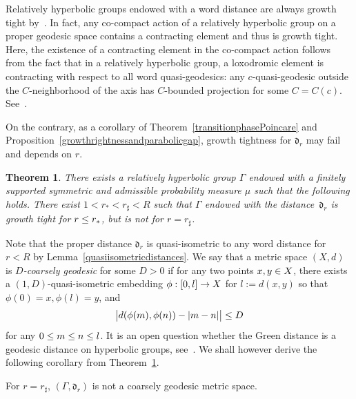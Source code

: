 \documentclass[10pt]{amsart}
\newtheorem{theo}{Theorem}[section]
\theoremstyle{definition}\newtheorem{defi}[theo]{Definition}\newtheorem{rema}[theo]{Remark}\newtheorem{exam}[theo]{Example}\newtheorem{exem}[theo]{Example}\newtheorem{nota}[theo]{Notation}
\newcommand{\fkd}{\mathfrak{d}}
\let\oldin\in
\renewcommand{\in}{\mathchoice{\oldin}{\oldin}{\,\oldin\,}{\,\oldin\,}}
\let\oldle\le
\renewcommand{\le}{\mathchoice{\oldle}{\oldle}{\,\oldle\,}{\,\oldle\,}}
\renewcommand*{\to}{\mathchoice{\longrightarrow}{\rightarrow}{\rightarrow}{\rightarrow}}
\begin{document}
Relatively hyperbolic groups endowed with a word distance are always growth tight by~\cite{ACT,YangTight}. In fact, any co-compact action of a relatively hyperbolic group on a proper geodesic space contains a contracting element and thus is growth tight. Here, the existence of a contracting element in the co-compact action follows from the fact that in a relatively hyperbolic group, a loxodromic element is contracting with respect to all word quasi-geodesics: any $c$-quasi-geodesic outside the $C$-neighborhood of the axis has $C$-bounded projection for some $C=C(c)$. See~\cite[Proposition~8.5]{GP16}.

On the contrary, as a corollary of Theorem~\ref{transitionphasePoincare} and Proposition~\ref{growthrightnessandparabolicgap}, growth tightness for $\fkd_r$ may fail and depends on $r$.

\begin{theo}\label{transitionphasegrowthtightness}
There exists a relatively hyperbolic group $\Gamma$ endowed with a finitely supported symmetric and admissible probability measure $\mu$ such that the following holds. There exist $1<r_*<r_\sharp<R$ such that $\Gamma$ endowed with the distance~$\fkd_r$ is growth tight for $r\le r_*$, but is not for $r=r_\sharp$.
\end{theo}



Note that the proper distance $\fkd_r$ is quasi-isometric to any word distance for $r<R$ by Lemma~\ref{quasiisometricdistances}. We say that a metric space $(X,d)$ is \emph{$D$-coarsely geodesic} for some\pagebreak{} $D>0$ if for any two points $x,y\in X$, there exists a $(1,D)$-quasi-isometric embedding $\phi: [0, l]\to X$ for $l:=d(x,y)$ so that $\phi(0)=x,\phi(l)=y$, and
\[
\bigl|d(\phi(m), \phi(n))-|m-n|\bigr|\le D
\]
for any $0\le m\le n\le l$. It is an open question whether the Green distance is a geodesic distance on hyperbolic groups, see~\cite[Section~1.7]{BHM11}. We shall however derive the following corollary from Theorem~\ref{transitionphasegrowthtightness}.

\begin{coro}\label{drnotgeodesic}
For $r=r_\sharp$, $(\Gamma,\fkd_r)$ is not a coarsely geodesic metric space.
\end{coro}
\end{document}
